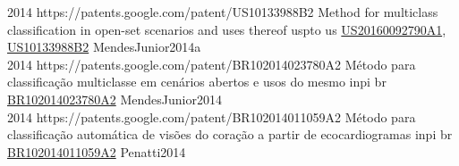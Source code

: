\begin{publications}
  {
  }
  {2014}
  {https://patents.google.com/patent/US10133988B2}
  {Method for multiclass classification in open-set scenarios and uses thereof}
  {uspto}
  {us}
  {\href{https://patents.google.com/patent/US20160092790A1}{US20160092790A1}, \href{https://patents.google.com/patent/US10133988B2}{US10133988B2}}
  {}
  {}
  {}
  {MendesJunior2014a}
  \\

  {
  }
  {2014}
  {https://patents.google.com/patent/BR102014023780A2}%
  {Método para classificação multiclasse em cenários abertos e usos do mesmo}
  {inpi}
  {br}
  {\href{https://patents.google.com/patent/BR102014023780A2}{BR102014023780A2}}
  {}
  {}
  {}
  {MendesJunior2014}
  \\

  {
  }
  {2014}
  {https://patents.google.com/patent/BR102014011059A2}
  {Método para classificação automática de visões do coração a partir de ecocardiogramas}
  {inpi}
  {br}
  {\href{https://patents.google.com/patent/BR102014011059A2}{BR102014011059A2}}
  {}
  {}
  {}
  {Penatti2014}
  \\

\end{publications}




